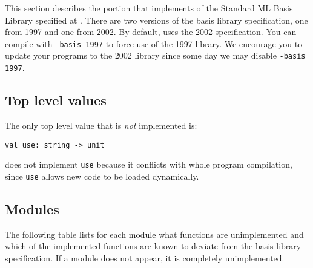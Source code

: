 
This section describes the portion that {\mlton} implements of the
Standard ML Basis Library specified at
.
There are two versions of the basis library specification, one from
1997 and one from 2002.  By default, {\mlton} uses the 2002
specification.  You can compile with {\tt -basis 1997} to force use of
the 1997 library.  We encourage you to update your programs to the
2002 library since some day we may disable {\tt -basis 1997}.

\subsection{Top level values}

The only top level value that is {\em not} implemented is:
\begin{verbatim}
val use: string -> unit
\end{verbatim}
{\mlton} does not implement {\tt use} because it conflicts with whole
program compilation, since {\tt use} allows new code to be loaded
dynamically.

\subsection{Modules}
The following table lists for each module what functions are unimplemented and
which of the implemented functions are known to deviate from the basis library
specification.  If a module does not appear, it is completely unimplemented.
\\
\newcommand{\module}[3]{{\tt #1:} & {\tt #2} & #3\\}
\newcommand{\extra}[1]{&& #1\\}
\newcommand{\fullmodule}[2]{\module{#1}{#2}{Fully implemented}}


